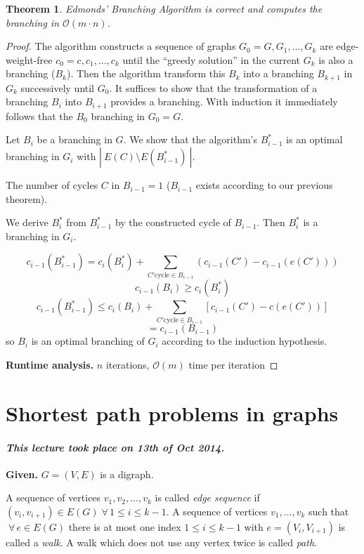 \documentclass{article}
\newtheorem{theorem}{Theorem}
\newcommand{\card}[1]{\left|\:\!#1\:\!\right|}
\newcommand{\given}[1]{\textbf{Given.} #1\par}
\newcommand{\dateref}[1]{\paragraph{\textit{This lecture took place on #1.}}}
\newcommand{\fall}{\;\forall\,}
\begin{document}
\begin{theorem}\label{satz-2.11}
Edmonds' Branching Algorithm is correct and computes the branching in $\mathcal{O}(m\cdot n)$.
\end{theorem}

\begin{proof}
The algorithm constructs a sequence of graphs $G_0 = G, G_1, \ldots, G_k$ are edge-weight-free $c_0 = c, c_1, \ldots, c_k$ until the ``greedy solution'' in the current $G_k$ is also a branching ($B_k$). Then the algorithm transform this $B_k$ into a branching $B_{k+1}$ in $G_k$ successively until $G_0$. It suffices to show that the transformation of a branching $B_i$ into $B_{i+1}$ provides a branching. With induction it immediately follows that the $B_0$ branching in $G_0 = G$.

Let $B_i$ be a branching in $G$. We show that the algorithm's $B^*_{i-1}$ is an optimal branching in $G_i$ with $\card{E(C) \setminus E(B^*_{i-1})}$.

The number of cycles $C$ in $B_{i-1} = 1$ ($B_{i-1}$ exists according to our previous theorem).

We derive $B^*_i$ from $B^*_{i-1}$ by the constructed cycle of $B_{i-1}$. Then $B^*_i$ is a branching in $G_i$.

\[
  c_{i-1}(B_{i-1}^*) = c_i(B_i^*) + \sum_{C' \text{cycle} \in B_{i-1}}(c_{i-1}(C') - c_{i-1}(e(C')))
\] \[
  c_{i-1}(B_i) \geq c_i(B^*_i)
\] \[
  c_{i-1}(B_{i-1}^*) \leq c_i(B_i) + \sum_{C' \text{cycle} \in B_{i-1}} \left[ c_{i-1}(C') - c(e(C')) \right]
\] \[
  = c_{i-1}(B_{i-1})
\]
so $B_i$ is an optimal branching of $G_i$ according to the induction hypothesis.

\textbf{Runtime analysis.}
  $n$ iterations, $\mathcal{O}(m)$ time per iteration
\end{proof}

\section{Shortest path problems in graphs}
%
\dateref{13th of Oct 2014}

\given{$G = (V, E)$ is a digraph.}

A sequence of vertices $v_1, v_2, \ldots, v_k$ is called \emph{edge sequence} if $(v_i, v_{i+1}) \in E(G) \fall 1 \leq i \leq k-1$. A sequence of vertices $v_1, \ldots, v_k$ such that $\fall e \in E(G)$ there is at most one index $1 \leq i \leq k-1$ with $e = (V_i, V_{i+1})$ is called a \emph{walk}. A walk which does not use any vertex twice is called \emph{path}.
\end{document}
